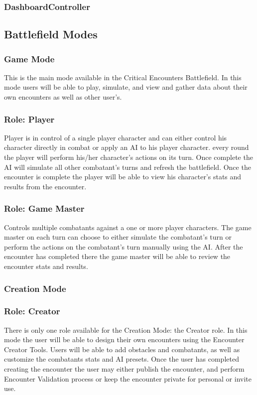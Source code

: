 \documentclass[12pt,a4paper]{report}
\begin{document}
		\subsubsection{DashboardController}
		
	\subsection{Battlefield Modes}
		\subsubsection{Game Mode}
			This is the main mode available in the Critical Encounters Battlefield. In this mode users will be able to play, simulate, and view and gather data about their own encounters as well as other user's.
			\subsubsection{Role: Player}
				Player is in control of a single player character and can either control his character directly in combat or apply an AI to his player character. every round the player will perform his/her character's actions on its turn. Once complete the AI will simulate all other combatant's turns and refresh the battlefield. Once the encounter is complete the player will be able to view his character's stats and results from the encounter.
			\subsubsection{Role: Game Master}
				Controls multiple combatants against a one or more player characters. The game master on each turn can choose to either simulate the combatant's turn or perform the actions on the combatant's turn manually using the AI. After the encounter has completed there the game master will be able to review the encounter stats and results.
				
		\subsubsection{Creation Mode}
			\subsubsection{Role: Creator}
				There is only one role available for the Creation Mode: the Creator role. In this mode the user will be able to design their own encounters using the Encounter Creator Tools. Users will be able to add obstacles and combatants, as well as customize the combatants stats and AI presets. Once the user has completed creating the encounter the user may either publish the encounter, and perform Encounter Validation process or keep the encounter private for personal or invite use.
\end{document}
